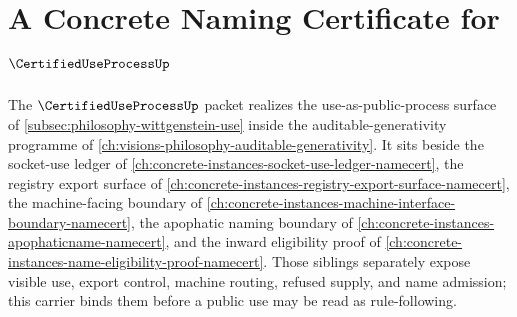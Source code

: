 \chapter{A Concrete Naming Certificate for $\CertifiedUseProcessUp$}
\label{ch:concrete-instances-certifieduseprocess-namecert}

The $\CertifiedUseProcessUp$ packet realizes the use-as-public-process surface of \autoref{subsec:philosophy-wittgenstein-use} inside the auditable-generativity programme of \autoref{ch:visions-philosophy-auditable-generativity}. It sits beside the socket-use ledger of \autoref{ch:concrete-instances-socket-use-ledger-namecert}, the registry export surface of \autoref{ch:concrete-instances-registry-export-surface-namecert}, the machine-facing boundary of \autoref{ch:concrete-instances-machine-interface-boundary-namecert}, the apophatic naming boundary of \autoref{ch:concrete-instances-apophaticname-namecert}, and the inward eligibility proof of \autoref{ch:concrete-instances-name-eligibility-proof-namecert}. Those siblings separately expose visible use, export control, machine routing, refused supply, and name admission; this carrier binds them before a public use may be read as rule-following.


